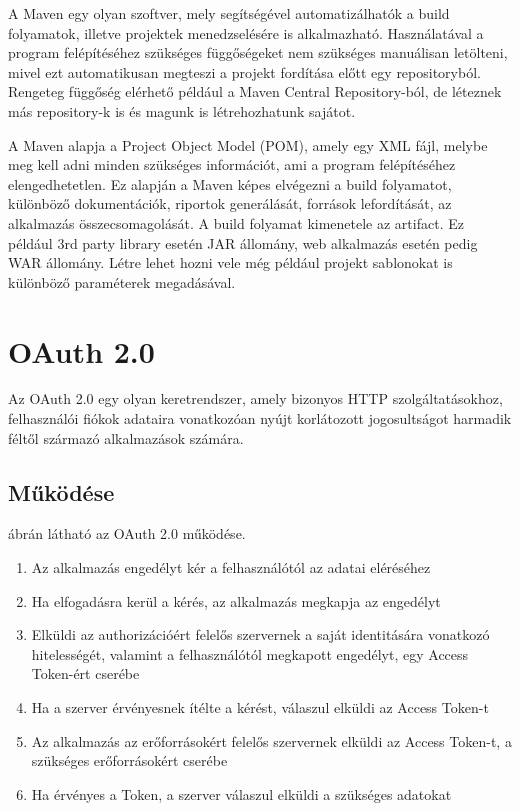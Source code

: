 A Maven egy olyan szoftver, mely segítségével automatizálhatók a build folyamatok, illetve projektek menedzselésére is alkalmazható.\cite{maven1, maven2}
Használatával a program felépítéséhez szükséges függőségeket nem szükséges manuálisan letölteni, mivel ezt automatikusan megteszi a projekt fordítása előtt egy repositoryból.
Rengeteg függőség elérhető például a Maven Central Repository-ból, de léteznek más repository-k is és magunk is létrehozhatunk sajátot. 

A Maven alapja a Project Object Model (POM), amely egy XML fájl, melybe meg kell adni minden szükséges információt, ami a program felépítéséhez elengedhetetlen.
Ez alapján a Maven képes elvégezni a build folyamatot, különböző dokumentációk, riportok generálását, források lefordítását, az alkalmazás összecsomagolását.
A build folyamat kimenetele az artifact.
Ez például 3rd party library esetén JAR állomány, web alkalmazás esetén pedig WAR állomány.
Létre lehet hozni vele még például projekt sablonokat is különböző paraméterek megadásával. 


\section{OAuth 2.0}

Az OAuth 2.0 egy olyan keretrendszer, amely bizonyos HTTP szolgáltatásokhoz, felhasználói fiókok adataira vonatkozóan nyújt korlátozott jogosultságot harmadik féltől származó alkalmazások számára.\cite{oauth}

\subsection*{Működése} 

 ábrán látható az OAuth 2.0 működése.



\begin{enumerate}
\item Az alkalmazás engedélyt kér a felhasználótól az adatai eléréséhez 
\item Ha elfogadásra kerül a kérés, az alkalmazás megkapja az engedélyt 
\item Elküldi az authorizációért felelős szervernek a saját identitására vonatkozó hitelességét, valamint a felhasználótól megkapott engedélyt, egy Access Token-ért cserébe 
\item Ha a szerver érvényesnek ítélte a kérést, válaszul elküldi az Access Token-t 
\item Az alkalmazás az erőforrásokért felelős szervernek elküldi az Access Token-t, a szükséges erőforrásokért cserébe 
\item Ha érvényes a Token, a szerver válaszul elküldi a szükséges adatokat 
\end{enumerate}


